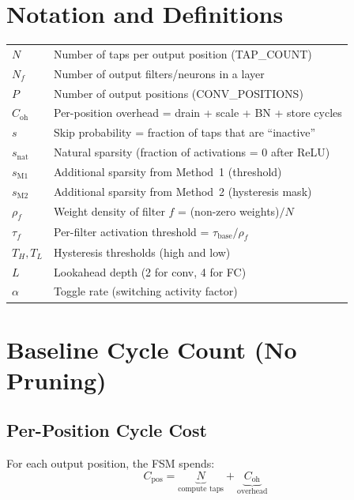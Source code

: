 \documentclass[11pt,a4paper]{article}
\begin{document}
\section{Notation and Definitions}

\begin{tabular}{ll}
$N$ & Number of taps per output position (TAP\_COUNT) \\
$N_f$ & Number of output filters/neurons in a layer \\
$P$ & Number of output positions (CONV\_POSITIONS) \\
$C_{\text{oh}}$ & Per-position overhead = drain + scale + BN + store cycles \\
$s$ & Skip probability = fraction of taps that are ``inactive'' \\
$s_{\text{nat}}$ & Natural sparsity (fraction of activations = 0 after ReLU) \\
$s_{\text{M1}}$ & Additional sparsity from Method~1 (threshold) \\
$s_{\text{M2}}$ & Additional sparsity from Method~2 (hysteresis mask) \\
$\rho_f$ & Weight density of filter $f$ = (non-zero weights)$/N$ \\
$\tau_f$ & Per-filter activation threshold = $\tau_{\text{base}} / \rho_f$ \\
$T_H, T_L$ & Hysteresis thresholds (high and low) \\
$L$ & Lookahead depth (2 for conv, 4 for FC) \\
$\alpha$ & Toggle rate (switching activity factor) \\
\end{tabular}

\section{Baseline Cycle Count (No Pruning)}
\label{sec:baseline}

\subsection{Per-Position Cycle Cost}

For each output position, the FSM spends:
\begin{equation}
C_{\text{pos}} = \underbrace{N}_{\text{compute taps}} + \underbrace{C_{\text{oh}}}_{\text{overhead}}
\end{equation}
\end{document}

